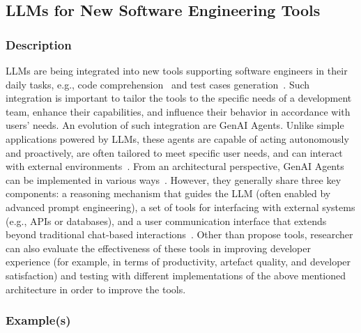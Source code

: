 \subsection{LLMs for New Software Engineering Tools}

\subsubsection{Description}

LLMs are being integrated into new tools supporting software engineers in their daily tasks, e.g., code comprehension~\cite{DBLP:conf/chi/YanHWH24} and test cases generation~\cite{DBLP:journals/tse/SchaferNET24}.
Such integration is important to tailor the tools to the specific needs of a development team, enhance their capabilities, and influence their behavior in accordance with users' needs.
An evolution of such integration are GenAI Agents.
Unlike simple applications powered by LLMs, these agents are capable of acting autonomously and proactively, are often tailored to meet specific user needs, and can interact with external environments~\cite{takerngsaksiri2024human,wiesinger2025agents}.
From an architectural perspective, GenAI Agents can be implemented in various ways~\cite{wiesinger2025agents}. However, they generally share three key components: a reasoning mechanism that guides the LLM (often enabled by advanced prompt engineering), a set of tools for interfacing with external systems (e.g., APIs or databases), and a user communication interface that extends beyond traditional chat-based interactions~\cite{DBLP:conf/icsm/RichardsW24, DBLP:journals/tmlr/SumersYN024, DBLP:journals/corr/abs-2309-07870}.
Other than propose tools, researcher can also evaluate the effectiveness of these tools in improving developer experience (for example, in terms of productivity, artefact quality, and developer satisfaction) and testing with different implementations of the above mentioned architecture in order to improve the tools.

\subsubsection{Example(s)}

